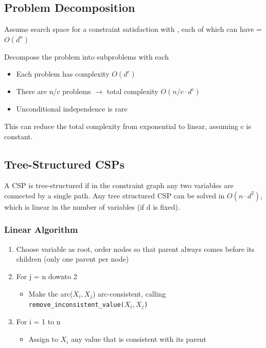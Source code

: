\documentclass[
../EiKI_Summary.tex,
]
{subfiles}
\begin{document}
\subsection{Problem Decomposition}
Assume search space for a constraint satisfaction with , each of which can have  = $O(d^n)$

Decompose the problem into subproblems with  each
\begin{itemize}
    \item Each problem has complexity $O(d^c)$
    \item There are n/c problems $\rightarrow$ total complexity $O(n/c\cdot d^c)$
    \item Unconditional independence is rare
\end{itemize}

This can reduce the total complexity from exponential to linear, assuming c is constant.

\subsection{Tree-Structured CSPs}
A CSP is tree-structured if in the constraint graph any two variables are connected by a single path. Any tree structured CSP can be solved in $O(n\cdot d^2)$, which is linear in the number of variables (if d is fixed).

\subsubsection{Linear Algorithm}
\begin{enumerate}
    \item Choose variable as root, order nodes so that parent always comes before its children (only one parent per node)
    \item For j = n downto 2
    \begin{itemize}
        \item Make the arc($X_i, X_{j}$) arc-consistent, calling \texttt{remove\_inconsistent\_value($X_i, X_{j}$)}
    \end{itemize}
    \item For i = 1 to n
    \begin{itemize}
        \item Assign to $X_i$ any value that is consistent with its parent
    \end{itemize}
\end{enumerate}
\end{document}
